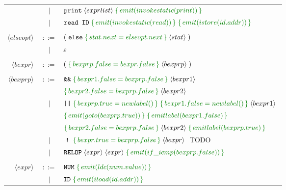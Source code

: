 \documentclass[a4paper]{article}
\newcommand{\cmd}[1]{\textcolor{MyGreen}{\{\, #1 \,\}} \;}
\newcommand{\node}[1]{\langle #1 \rangle \;}
\newcommand{\tag}[1]{\texttt{#1} \;}
\begin{document}
\begin{center}
\begin{tabular}{ r c l }
                      &  $|$  & $\tag{print} \node{exprlist} \cmd{emit(invokestatic(print))}$ \\

                      &  $|$  & $\texttt{read ID}\; \cmd{emit(invokestatic(read))} \cmd{emit(istore(id.addr))}$ \\\\
  $\node{elseopt}$    & $::=$ & $(\; \tag{else} \cmd{stat.next = elseopt.next} \node{stat})$ \\
                      &  $|$  & $\varepsilon$ \\\\
  $\node{bexpr}$      & $::=$ & $(\; \cmd{bexprp.false = bexpr.false} \node{bexprp} )$ \\\\
  $\node{bexprp}$     & $::=$ & $\tag{\&\&} \cmd{bexpr1.false = bexprp.false} \node{bexpr1}$ \\
                      &       & $\cmd{bexpr2.false = bexprp.false} \node{bexpr2}$ \\
                      &  $|$  & $\tag{||} \cmd{bexprp.true = newlabel()} \cmd{bexpr1.false = newlabel()} \node{bexpr1}$ \\
                      &       & $\cmd{emit(goto(bexprp.true))} \cmd{emitlabel(bexpr1.false)}$ \\
                      &       & $\cmd{bexpr2.false = bexprp.false} \node{bexpr2} \cmd{emitlabel(bexprp.true)}$ \\
                      &  $|$  & $\;\tag{!}\; \cmd{bexpr.true = bexprp.false} \node{bexpr}$ TODO \\
                      &  $|$  & $\tag{RELOP} \node{expr} \node{expr} \cmd{emit(if\_icmp(bexprp.false))}$ \\\\
  $\node{expr}$       & $::=$ & $\tag{NUM} \cmd{emit(ldc(num.value))}$ \\

                      &  $|$  & $\tag{ID} \cmd{emit(iload(id.addr))}$ \\


\end{tabular}
\end{center}
\end{document}
